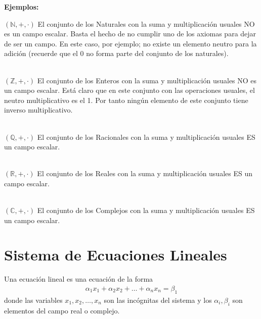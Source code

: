 \textbf{Ejemplos:}



$\left( \mathbb{N},+ ,\cdot \right) $
El conjunto de los Naturales con la suma y multiplicación usuales NO es un campo escalar.
Basta el hecho de no cumplir uno de los axiomas para dejar de ser un campo. En este caso, por ejemplo; no existe un elemento neutro para la adición (recuerde que el 0 no forma parte del conjunto de los naturales).

~\\
$\left( \mathbb{Z},+ ,\cdot \right) $ 
El conjunto de los Enteros con la suma y multiplicación usuales NO es un campo escalar.
Está claro que en este conjunto con las operaciones usuales, el neutro multiplicativo es el 1. Por tanto ningún elemento de este conjunto tiene inverso multiplicativo.

~\\
$\left( \mathbb{Q},+ ,\cdot \right) $ 
El conjunto de los Racionales con la suma y multiplicación usuales ES un campo escalar.

~\\
$\left( \mathbb{R},+ ,\cdot \right) $ 
El conjunto de los Reales con la suma y multiplicación usuales ES un campo escalar.

~\\
$\left( \mathbb{C},+ ,\cdot \right) $ 
El conjunto de los Complejos con la suma y multiplicación usuales ES un campo escalar.


\section{Sistema de Ecuaciones Lineales}

Una ecuación lineal es una ecuación de la forma
\begin{align*}
\alpha_1 x_1+\alpha_2 x_2+\hdots+\alpha_n x_n=\beta_1
\end{align*} 
donde las variables $x_1, x_2, \hdots, x_n$ son las incógnitas del sistema y los $\alpha_i, \beta_i$ son elementos del campo real o complejo.

